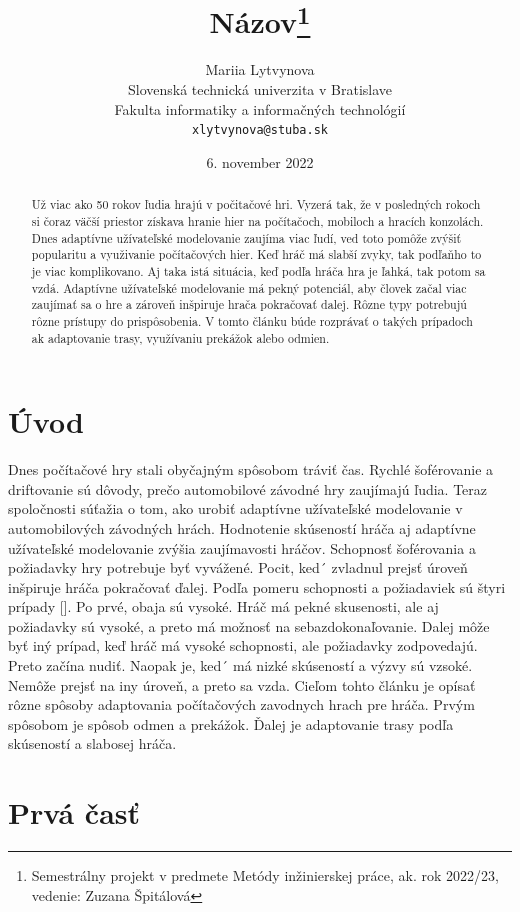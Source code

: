 \documentclass[10pt,twoside,slovak,a4paper]{article}
\title{Názov\thanks {Semestrálny projekt v predmete Metódy inžinierskej práce, ak. rok 2022/23, vedenie: Zuzana Špitálová}} %
\author{Mariia Lytvynova\\[2pt]
	{\small Slovenská technická univerzita v Bratislave}\\
	{\small Fakulta informatiky a informačných technológií}\\
	{\small \texttt{xlytvynova@stuba.sk}}
	}
\date{\small 6. november 2022} %
\begin{document}
\maketitle

\begin{abstract}

Už viac ako 50 rokov ľudia hrajú v počitačové hri. Vyzerá tak, že v posledných rokoch si čoraz väčší priestor získava hranie hier na počítačoch, mobiloch a hracích konzolách.  Dnes adaptívne užívateľské modelovanie zaujíma viac ľudí, ved toto pomôže zvýšiť popularitu a využivanie počítačových hier. Keď hráč má slabší zvyky, tak podľaňho to je viac komplikovano. Aj taka istá situácia, keď podľa hráča hra je ľahká, tak potom sa vzdá. Adaptívne užívateľské modelovanie má pekný potenciál, aby človek začal viac zaujímať sa o hre a zároveň inšpiruje hrača pokračovať dalej. Rôzne typy potrebujú rôzne prístupy do prispôsobenia. V tomto článku búde rozprávať o takých prípadoch ak adaptovanie trasy, využívaniu prekážok alebo odmien. 
\end{abstract}



\section{Úvod}

Dnes počítačové hry stali obyčajným spôsobom tráviť čas. Rychlé šoférovanie a driftovanie sú dôvody, prečo automobilové závodné hry zaujímajú ľudia. Teraz spoločnosti súťažia o tom, ako urobiť adaptívne užívateľské modelovanie v automobilových závodných hrách. Hodnotenie skúseností hráča aj adaptívne užívateľské modelovanie zvýšia zaujímavosti hráčov. Schopnosť šoférovania a požiadavky hry potrebuje byť vyvážené. Pocit, ked´ zvladnul prejsť úroveň inšpiruje hráča pokračovať ďalej. Podľa pomeru schopnosti a požiadaviek sú štyri prípady []. Po prvé, obaja sú vysoké. Hráč má pekné skusenosti, ale aj požiadavky sú vysoké, a preto má možnosť na sebazdokonaľovanie. Dalej môže byť iný prípad, keď hráč má vysoké schopnosti, ale požiadavky zodpovedajú. Preto začína nudiť. Naopak je, ked´ má nizké skúseností a výzvy sú vzsoké. Nemôže prejsť na iny úroveň, a preto sa vzda.
Cieľom tohto článku je opísať rôzne spôsoby adaptovania počítačových zavodnych hrach pre hráča. Prvým spôsobom je spôsob odmen a prekážok.  Ďalej je  adaptovanie trasy podľa skúseností a slabosej hráča.

\section{Prvá časť} \label{prvá časť}
\end{document}
